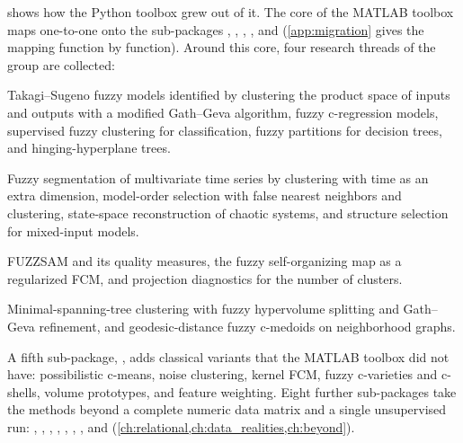  shows how the Python toolbox grew out of it. The core of the MATLAB toolbox maps one-to-one onto the sub-packages , , , , and  (\cref{app:migration} gives the mapping function by function). Around this core, four research threads of the group are collected:
\begin{description}[style=nextline]
  \item[Identification (\code{fuzzyclust.models}).] Takagi--Sugeno fuzzy models identified by clustering the product space of inputs and outputs with a modified Gath--Geva algorithm, fuzzy c-regression models, supervised fuzzy clustering for classification, fuzzy partitions for decision trees, and hinging-hyperplane trees.
  \item[Time series (\code{fuzzyclust.timeseries}).] Fuzzy segmentation of multivariate time series by clustering with time as an extra dimension, model-order selection with false nearest neighbors and clustering, state-space reconstruction of chaotic systems, and structure selection for mixed-input models.
  \item[Visualization (\code{fuzzyclust.viz}).] FUZZSAM and its quality measures, the fuzzy self-organizing map as a regularized FCM, and projection diagnostics for the number of clusters.
  \item[Graph methods (\code{fuzzyclust.graph}).] Minimal-spanning-tree clustering with fuzzy hypervolume splitting and Gath--Geva refinement, and geodesic-distance fuzzy c-medoids on neighborhood graphs.
\end{description}
A fifth sub-package, , adds classical variants that the MATLAB toolbox did not have: possibilistic c-means, noise clustering, kernel FCM, fuzzy c-varieties and c-shells, volume prototypes, and feature weighting. Eight further sub-packages take the methods beyond a complete numeric data matrix and a single unsupervised run: , , , , , , , and  (\cref{ch:relational,ch:data_realities,ch:beyond}).

